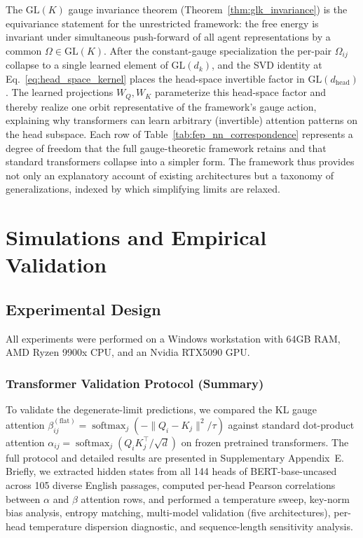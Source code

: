 \documentclass[twoside,11pt]{article}
\newcommand{\softmax}{\operatorname{softmax}}
\begin{document}
The $\mathrm{GL}(K)$ gauge invariance theorem (Theorem~\ref{thm:glk_invariance}) is the equivariance statement for the unrestricted framework: the free energy is invariant under simultaneous push-forward of all agent representations by a common $\Omega \in \mathrm{GL}(K)$. After the constant-gauge specialization the per-pair $\Omega_{ij}$ collapse to a single learned element of $\mathrm{GL}(d_k)$, and the SVD identity at Eq.~\eqref{eq:head_space_kernel} places the head-space invertible factor in $\mathrm{GL}(d_{\text{head}})$. The learned projections $W_Q, W_K$ parameterize this head-space factor and thereby realize one orbit representative of the framework's gauge action, explaining why transformers can learn arbitrary (invertible) attention patterns on the head subspace. Each row of Table~\ref{tab:fep_nn_correspondence} represents a degree of freedom that the full gauge-theoretic framework retains and that standard transformers collapse into a simpler form. The framework thus provides not only an explanatory account of existing architectures but a taxonomy of generalizations, indexed by which simplifying limits are relaxed.


\section{Simulations and Empirical Validation}

\subsection{Experimental Design}

All experiments were performed on a Windows workstation with 64GB RAM, AMD Ryzen 9900x CPU, and an Nvidia RTX5090 GPU.

\subsubsection{Transformer Validation Protocol (Summary)}
\label{sec:bert_summary}
To validate the degenerate-limit predictions, we compared the KL gauge attention $\beta_{ij}^{(\mathrm{flat})} = \softmax_j(-\|Q_i - K_j\|^2/\tau)$ against standard dot-product attention $\alpha_{ij} = \softmax_j(Q_i K_j^\top / \sqrt{d})$ on frozen pretrained transformers. The full protocol and detailed results are presented in Supplementary Appendix~E. Briefly, we extracted hidden states from all 144 heads of BERT-base-uncased across 105 diverse English passages, computed per-head Pearson correlations between $\alpha$ and $\beta$ attention rows, and performed a temperature sweep, key-norm bias analysis, entropy matching, multi-model validation (five architectures), per-head temperature dispersion diagnostic, and sequence-length sensitivity analysis.
\end{document}
